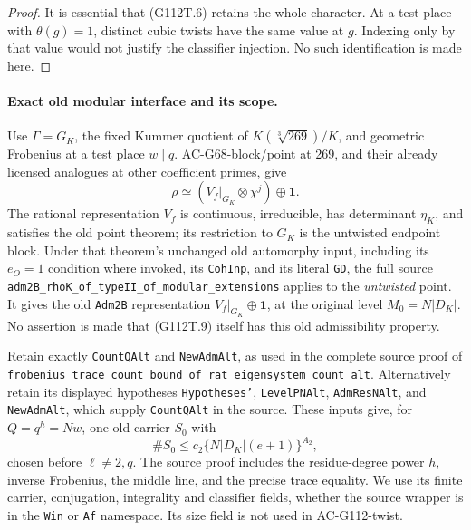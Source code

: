 \begin{proof}
It is essential that (G112T.6) retains the whole character.  At a
test place with \(\theta(g)=1\), distinct cubic twists have the same
value at \(g\).  Indexing only by that value would not justify the
classifier injection.  No such identification is made here.
\end{proof}

\paragraph{Exact old modular interface and its scope.}
Use \(\Gamma=G_K\), the fixed Kummer quotient of
\(K(\sqrt[3]{269})/K\), and geometric Frobenius at a test place
\(w\mid q\).  AC-G68-block/point at 269, and their already licensed
analogues at other coefficient primes, give
\[
       \rho\simeq (V_f|_{G_K}\otimes\chi^j)\oplus\mathbf1.
                                                        \tag{G112T.9}
\]
The rational representation \(V_f\) is continuous, irreducible,
has determinant \(\eta_K\), and satisfies the old point theorem;
its restriction to \(G_K\) is the untwisted endpoint block.
Under that
theorem's unchanged old automorphy input, including its \(e_O=1\)
condition where invoked, its \texttt{CohInp}, and its literal
\texttt{GD}, the full source
\texttt{adm2B\_rhoK\_of\_typeII\_of\_modular\_extensions} applies
to the \emph{untwisted} point.  It gives the old
\texttt{Adm2B} representation \(V_f|_{G_K}\oplus\mathbf1\), at
the original level \(M_0=N|D_K|\).  No assertion is made that
(G112T.9) itself has this old admissibility property.

Retain exactly \texttt{CountQAlt} and \texttt{NewAdmAlt}, as used
in the complete source proof of
\texttt{frobenius\_trace\_count\_bound\_of\_rat\_eigensystem\_count\_alt}.
Alternatively retain its displayed hypotheses
\texttt{Hypotheses'}, \texttt{LevelPNAlt}, \texttt{AdmResNAlt},
and \texttt{NewAdmAlt}, which supply \texttt{CountQAlt} in the
source.  These inputs give, for \(Q=q^{h}=Nw\), one old carrier
\(S_0\) with
\[
              \#S_0\le c_2\{N|D_K|(e+1)\}^{A_2},
                                                        \tag{G112T.10}
\]
chosen before \(\ell\ne2,q\).  The source proof includes the
residue-degree power \(h\), inverse Frobenius, the middle line,
and the precise trace equality.  We use its finite carrier,
conjugation, integrality and classifier fields, whether the source
wrapper is in the \texttt{Win} or \texttt{Af} namespace.  Its size
field is not used in AC-G112-twist.


